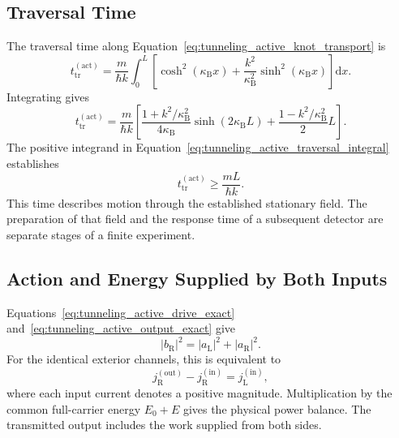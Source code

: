 \subsection{Traversal Time}

The traversal time along Equation~\eqref{eq:tunneling_active_knot_transport} is
\begin{equation}
    t_{\mathrm{tr}}^{(\mathrm{act})}
    =\frac{m}{\hbar k}
    \int_0^L
    \left[
        \cosh^2(\kappa_{\mathrm B}x)
        +\frac{k^2}{\kappa_{\mathrm B}^2}
        \sinh^2(\kappa_{\mathrm B}x)
    \right]\mathrm dx.
    \label{eq:tunneling_active_traversal_integral}
\end{equation}
Integrating gives
\begin{equation}
    \boxed{
    t_{\mathrm{tr}}^{(\mathrm{act})}
    =\frac{m}{\hbar k}
    \left[
        \frac{1+k^2/\kappa_{\mathrm B}^2}{4\kappa_{\mathrm B}}
        \sinh(2\kappa_{\mathrm B}L)
        +\frac{1-k^2/\kappa_{\mathrm B}^2}{2}L
    \right]
    }.
    \label{eq:tunneling_active_traversal_time}
\end{equation}
The positive integrand in Equation~\eqref{eq:tunneling_active_traversal_integral} establishes
\begin{equation}
    t_{\mathrm{tr}}^{(\mathrm{act})}\geq\frac{mL}{\hbar k}.
\end{equation}
This time describes motion through the established stationary field. The preparation of that field and the response time of a subsequent detector are separate stages of a finite experiment.

\subsection{Action and Energy Supplied by Both Inputs}

Equations~\eqref{eq:tunneling_active_drive_exact} and~\eqref{eq:tunneling_active_output_exact} give
\begin{equation}
    \boxed{
    |b_{\mathrm R}|^2=|a_{\mathrm L}|^2+|a_{\mathrm R}|^2
    }.
    \label{eq:tunneling_active_amplitude_balance}
\end{equation}
For the identical exterior channels, this is equivalent to
\begin{equation}
    j_{\mathrm R}^{(\mathrm{out})}
    -j_{\mathrm R}^{(\mathrm{in})}
    =j_{\mathrm L}^{(\mathrm{in})},
    \label{eq:tunneling_active_current_balance}
\end{equation}
where each input current denotes a positive magnitude. Multiplication by the common full-carrier energy $E_0+E$ gives the physical power balance. The transmitted output includes the work supplied from both sides.

